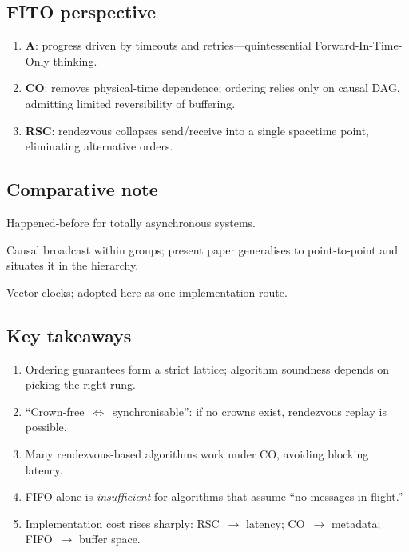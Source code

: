 \documentclass[../../../OAE-SPEC-MAIN.tex]{subfiles}
\begin{document}
\subsection{FITO perspective}


\begin{enumerate}[label=\arabic*.]
  \item \textbf{A}: progress driven by timeouts and retries—quintessential Forward-In-Time-Only thinking.
  \item \textbf{CO}: removes physical-time dependence; ordering relies only on causal DAG, admitting limited reversibility of buffering.
  \item \textbf{RSC}: rendezvous collapses send/receive into a single spacetime point, eliminating alternative orders.
\end{enumerate}

\subsection{Comparative note}
\begin{description}[leftmargin=*,style=nextline]
  \item[Lamport (1978)] Happened‑before for totally asynchronous systems.
  \item[Birman \& Joseph (1987)] Causal broadcast within groups; present paper generalises to point‑to‑point and situates it in the hierarchy.
  \item[Fidge (1991)] Vector clocks; adopted here as one implementation route.
\end{description}

\subsection{Key takeaways}
\begin{enumerate}
  \item Ordering guarantees form a strict lattice; algorithm soundness depends on picking the right rung.
  \item “Crown‑free $\iff$ synchronisable”: if no crowns exist, rendezvous replay is possible.
  \item Many rendezvous‑based algorithms work under CO, avoiding blocking latency.
  \item FIFO alone is \emph{insufficient} for algorithms that assume “no messages in flight.”
  \item Implementation cost rises sharply: RSC $\to$ latency; CO $\to$ metadata; FIFO $\to$ buffer space.
\end{enumerate}

\end{document}
